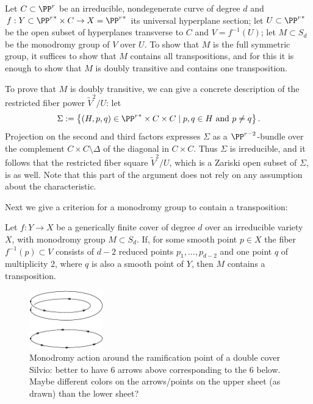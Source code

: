 Let $C \subset \PP^r$ be an irreducible, nondegenerate curve of degree $d$ and $f : Y \subset {\PP^r}^* \times C \to  X = {\PP^r}^*$ its universal hyperplane section; let $U \subset {\PP^r}^*$ be the open subset of hyperplanes transverse to $C$ and $V = f^{-1}(U)$; let $M \subset S_d$ be the monodromy group of $V$ over $U$.
To show that  $M$ is the full symmetric group, it suffices to show that $M$ contains all transpositions, and for this it is enough to show that $M$ is doubly transitive and contains one transposition.

To prove that $M$ is doubly transitive, we can give a concrete description of the restricted fiber power $\tilde V^2/U$: let
$$
\Sigma := \left\{ (H, p, q) \in {\PP^r}^* \times C \times C \mid p, q \in H \text{ and } p \neq q \right\}.
$$
Projection on the second and third factors expresses $\Sigma$ as a $\PP^{r-2}$-bundle over the complement $C \times C \setminus \Delta$ of the diagonal in $C \times C$. Thus $\Sigma$ is irreducible, and it follows that the restricted fiber square $\tilde V^2/U$, which is a Zariski open subset of $\Sigma$, is as well. Note that this part of the argument does not rely on any assumption about the characteristic.

Next we give a criterion for a monodromy group to contain a transposition:

\begin{lemma}\label{transposition lemma}
Let $f : Y \to X$ be a generically finite cover of degree $d$ over an irreducible variety $X$, with  monodromy group $M \subset S_d$.  
If,  for some smooth point $p \in X$ the fiber $f^{-1}(p)\subset V$ consists of $d-2$ reduced points $p_1,\dots, p_{d-2}$ and one point $q$ of multiplicity 2, where $q$ is also a smooth point of $Y$, then $M$ contains a transposition.
\end{lemma}

\begin{figure}
\centerline {\includegraphics[height=1in]{"main/Fig10-1"}}
\caption{Monodromy action around the ramification point of a double cover
{Silvio: better to have 6 arrows above corresponding to the 6 below. Maybe different colors on the  
arrows/points on the upper sheet (as drawn) than the lower sheet?}
}
\label{default}
\end{figure}

